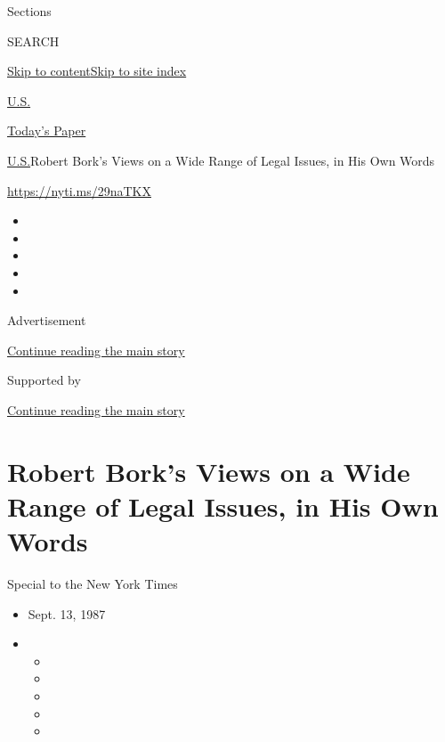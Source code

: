 Sections

SEARCH

\protect\hyperlink{site-content}{Skip to
content}\protect\hyperlink{site-index}{Skip to site index}

\href{https://www.nytimes3xbfgragh.onion/section/us}{U.S.}

\href{https://myaccount.nytimes3xbfgragh.onion/auth/login?response_type=cookie\&client_id=vi}{}

\href{https://www.nytimes3xbfgragh.onion/section/todayspaper}{Today's
Paper}

\href{/section/us}{U.S.}\textbar{}Robert Bork's Views on a Wide Range of
Legal Issues, in His Own Words

\url{https://nyti.ms/29naTKX}

\begin{itemize}
\item
\item
\item
\item
\item
\end{itemize}

Advertisement

\protect\hyperlink{after-top}{Continue reading the main story}

Supported by

\protect\hyperlink{after-sponsor}{Continue reading the main story}

\hypertarget{robert-borks-views-on-a-wide-range-of-legal-issues-in-his-own-words}{%
\section{Robert Bork's Views on a Wide Range of Legal Issues, in His Own
Words}\label{robert-borks-views-on-a-wide-range-of-legal-issues-in-his-own-words}}

Special to the New York Times

\begin{itemize}
\item
  Sept. 13, 1987
\item
  \begin{itemize}
  \item
  \item
  \item
  \item
  \item
  \end{itemize}
\end{itemize}

